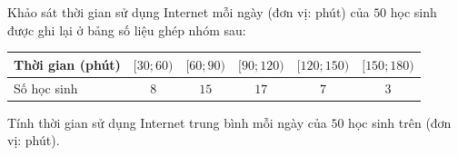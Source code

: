 \begin{ex}
Khảo sát thời gian sử dụng Internet mỗi ngày (đơn vị: phút) của $50$ học sinh được ghi lại ở bảng số liệu ghép nhóm sau:
\begin{center}\begin{tabular}{|l|c|c|c|c|c|}\hline
Thời gian (phút) & $[30;60)$ & $[60;90)$ & $[90;120)$ & $[120;150)$ & $[150;180)$\\\hline
Số học sinh & $8$ & $15$ & $17$ & $7$ & $3$\\\hline
\end{tabular}\end{center}
Tính thời gian sử dụng Internet trung bình mỗi ngày của $50$ học sinh trên (đơn vị: phút).
\end{ex}
